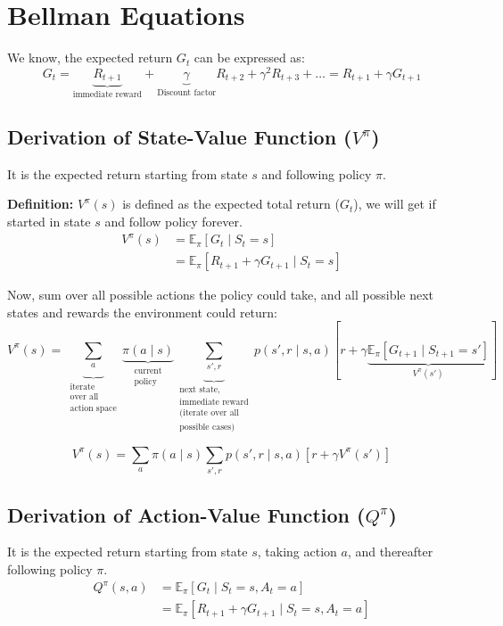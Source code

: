 \documentclass[12pt]{article}
\begin{document}
\section{Bellman Equations}

We know, the expected return $G_t$ can be expressed as:
\[
G_t = \underbrace{R_{t+1}}_{\text{immediate reward}} + \underbrace{\gamma}_{\text{Discount factor}} R_{t+2} + \gamma^2 R_{t+3} + \dots = R_{t+1} + \gamma G_{t+1}
\]

\subsection{Derivation of State-Value Function ($V^\pi$)}
It is the expected return starting from state $s$ and following policy $\pi$.

\textbf{Definition:} $V^\pi(s)$ is defined as the expected total return ($G_t$), we will get if started in state $s$ and follow policy forever.
\begin{align*}
V^\pi(s) &= \mathbb{E}_\pi [G_t \mid S_t = s] \\
&= \mathbb{E}_\pi [R_{t+1} + \gamma G_{t+1} \mid S_t = s]
\end{align*}

Now, sum over all possible actions the policy could take, and all possible next states and rewards the environment could return:
\[
V^\pi(s) = \underbrace{\sum_{a}}_{\substack{\text{iterate} \\ \text{over all} \\ \text{action space}}} \underbrace{\pi(a \mid s)}_{\substack{\text{current} \\ \text{policy}}} \underbrace{\sum_{s', r}}_{\substack{\text{next state, } \\ \text{immediate reward} \\ \text{(iterate over all} \\ \text{possible cases)}}} p(s', r \mid s, a) \left[ r + \gamma \underbrace{\mathbb{E}_\pi[G_{t+1} \mid S_{t+1} = s']}_{V^\pi(s')} \right]
\]

\[
V^\pi(s) = \sum_{a} \pi(a \mid s) \sum_{s', r} p(s', r \mid s, a) \left[ r + \gamma V^\pi(s') \right]
\]

\subsection{Derivation of Action-Value Function ($Q^\pi$)}
It is the expected return starting from state $s$, taking action $a$, and thereafter following policy $\pi$.
\begin{align*}
Q^\pi(s, a) &= \mathbb{E}_\pi [G_t \mid S_t = s, A_t = a] \\
&= \mathbb{E}_\pi [R_{t+1} + \gamma G_{t+1} \mid S_t = s, A_t = a]
\end{align*}
\end{document}

